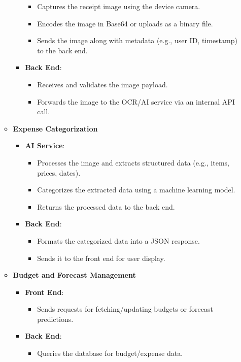 \documentclass[12pt, titlepage]{article}
\begin{document}
\begin{enumerate}
\begin{itemize}
\begin{itemize}
\begin{itemize}
				\item Captures the receipt image using the device camera.
				\item Encodes the image in Base64 or uploads as a binary file.
				\item Sends the image along with metadata (e.g., user ID, timestamp) to the back end.
			\end{itemize}
			\item \textbf{Back End}:
			\begin{itemize}
				\item Receives and validates the image payload.
				\item Forwards the image to the OCR/AI service via an internal API call.
			\end{itemize}
		\end{itemize}
		\item \textbf{Expense Categorization}
		\begin{itemize}
			\item \textbf{AI Service}:
			\begin{itemize}
				\item Processes the image and extracts structured data (e.g., items, prices, dates).
				\item Categorizes the extracted data using a machine learning model.
				\item Returns the processed data to the back end.
			\end{itemize}
			\item \textbf{Back End}:
			\begin{itemize}
				\item Formats the categorized data into a JSON response.
				\item Sends it to the front end for user display.
			\end{itemize}
		\end{itemize}
		\item \textbf{Budget and Forecast Management}
		\begin{itemize}
			\item \textbf{Front End}:
			\begin{itemize}
				\item Sends requests for fetching/updating budgets or forecast predictions.
			\end{itemize}
			\item \textbf{Back End}:
			\begin{itemize}
				\item Queries the database for budget/expense data.

\end{itemize}
\end{itemize}
\end{itemize}
\end{enumerate}
\end{document}
